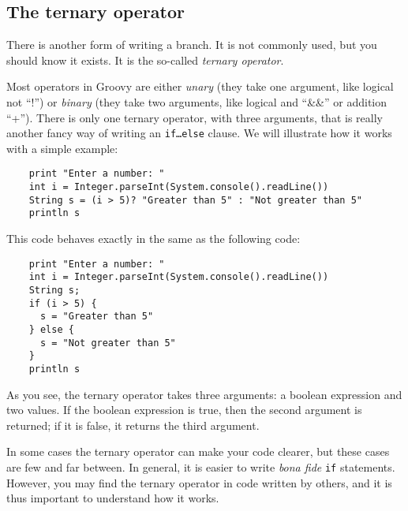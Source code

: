 
\subsection{The ternary operator}
\label{sec:ternary-operator}

There is another form of writing a branch. It is not commonly used,
but you should know it exists. It is the so-called \emph{ternary
  operator}. 

Most operators in Groovy are either \emph{unary} (they take one
argument, like logical not ``!'') or \emph{binary} (they take two
arguments, like logical and ``\&\&'' or addition ``+''). There is only
one ternary operator, with three arguments, that is really another
fancy way of writing an \texttt{if\ldots else} clause. We will
illustrate how it works with a simple example:

\begin{verbatim}
    print "Enter a number: "
    int i = Integer.parseInt(System.console().readLine())
    String s = (i > 5)? "Greater than 5" : "Not greater than 5"
    println s
\end{verbatim}

This code behaves exactly in the same as the following code:

\begin{verbatim}
    print "Enter a number: "
    int i = Integer.parseInt(System.console().readLine())
    String s;
    if (i > 5) {
      s = "Greater than 5"
    } else {
      s = "Not greater than 5"
    }
    println s
\end{verbatim}

As you see, the ternary operator takes three arguments: a boolean
expression and two values. If the boolean expression is true, then the
second argument is returned; if it is false, it returns the third
argument. 

In some cases the ternary operator can make your code clearer, but
these cases are few and far between. In general, it is easier to write
\emph{bona fide} \texttt{if} statements. However, you may find the
ternary operator in code written by others, and it is thus important
to understand how it works. 

